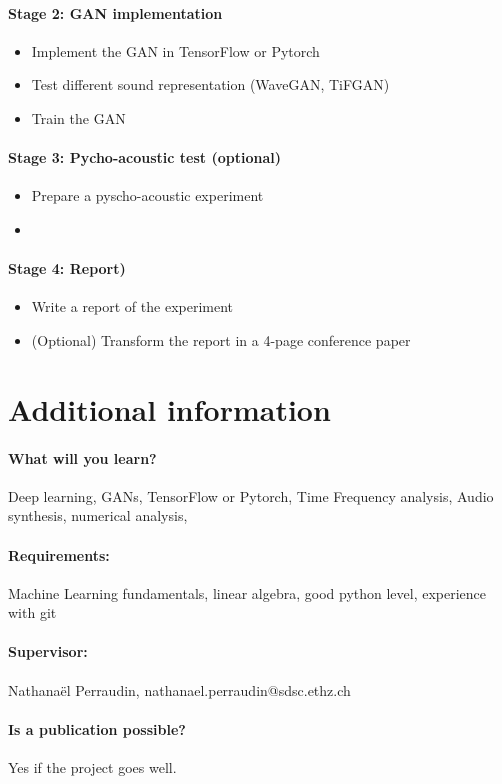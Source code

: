 \documentclass[a4paper]{article}
\begin{document}
\paragraph{Stage 2: GAN implementation}
\begin{itemize}
	\item Implement the GAN in TensorFlow or Pytorch
	\item Test different sound representation (WaveGAN, TiFGAN)
	\item Train the GAN
\end{itemize}

\paragraph{Stage 3: Pycho-acoustic test (optional)}
\begin{itemize}
	\item Prepare a pyscho-acoustic experiment
	\item 
\end{itemize}

\paragraph{Stage 4: Report)}
\begin{itemize}
	\item Write a report of the experiment
	\item (Optional) Transform the report in a 4-page conference paper
\end{itemize}

\section{Additional information}
\paragraph{What will you learn?}  Deep learning, GANs, TensorFlow or Pytorch, Time Frequency analysis, Audio synthesis, numerical analysis,
\paragraph{Requirements:} Machine Learning fundamentals, linear algebra, good python level, experience with git 
\paragraph{Supervisor:} Nathanaël Perraudin, nathanael.perraudin@sdsc.ethz.ch
\paragraph{Is a publication possible?} Yes if the project goes well.


\clearpage
\newpage


{}
\end{document}
